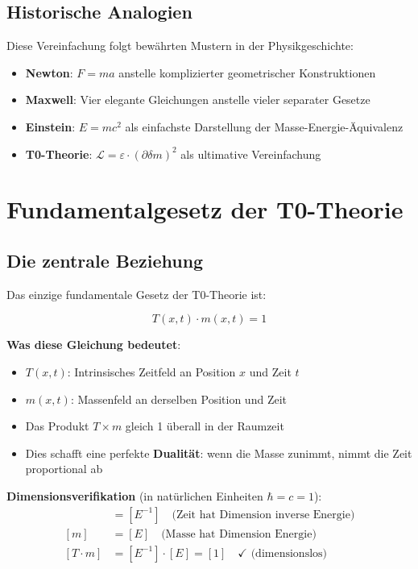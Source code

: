 \documentclass[12pt,a4paper]{article}
\newcommand{\Tfield}{T(x,t)}
\newcommand{\mfield}{m(x,t)}
\newcommand{\deltam}{\delta m}
\newcommand{\Lag}{\mathcal{L}}
\theoremstyle{definition}
\theoremstyle{remark}
\begin{document}
	\subsection{Historische Analogien}
	
	Diese Vereinfachung folgt bewährten Mustern in der Physikgeschichte:
	\begin{itemize}
		\item \textbf{Newton}: $F = ma$ anstelle komplizierter geometrischer Konstruktionen
		\item \textbf{Maxwell}: Vier elegante Gleichungen anstelle vieler separater Gesetze
		\item \textbf{Einstein}: $E = mc^2$ als einfachste Darstellung der Masse-Energie-Äquivalenz
		\item \textbf{T0-Theorie}: $\Lag = \varepsilon \cdot (\partial \deltam)^2$ als ultimative Vereinfachung
	\end{itemize}
	
	\section{Fundamentalgesetz der T0-Theorie}
	
	\subsection{Die zentrale Beziehung}
	
	Das einzige fundamentale Gesetz der T0-Theorie ist:
	
	\begin{equation}
		\boxed{\Tfield \cdot \mfield = 1}
		\label{eq:fundamental_law}
	\end{equation}
	
	\textbf{Was diese Gleichung bedeutet}:
	\begin{itemize}
		\item $T(x,t)$: Intrinsisches Zeitfeld an Position $x$ und Zeit $t$
		\item $m(x,t)$: Massenfeld an derselben Position und Zeit
		\item Das Produkt $T \times m$ gleich 1 überall in der Raumzeit
		\item Dies schafft eine perfekte \textbf{Dualität}: wenn die Masse zunimmt, nimmt die Zeit proportional ab
	\end{itemize}
	
	\textbf{Dimensionsverifikation} (in natürlichen Einheiten $\hbar = c = 1$):
	\begin{align}
		[T] &= [E^{-1}] \quad \text{(Zeit hat Dimension inverse Energie)} \\
		[m] &= [E] \quad \text{(Masse hat Dimension Energie)} \\
		[T \cdot m] &= [E^{-1}] \cdot [E] = [1] \quad \checkmark \text{ (dimensionslos)}
	\end{align}
	
\end{document}
